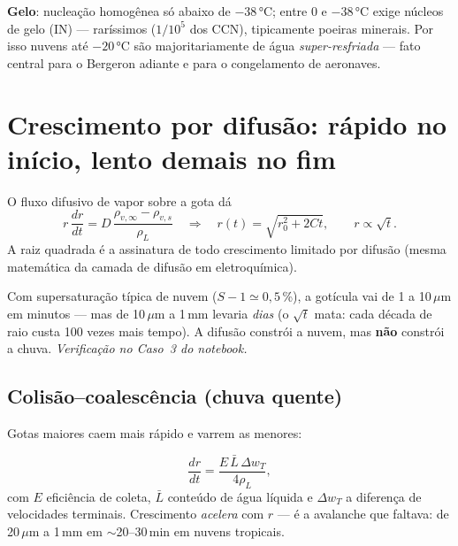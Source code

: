 \documentclass[11pt]{article}
\begin{document}
\textbf{Gelo}: nucleação homogênea só abaixo de $-38\,°$C; entre 0 e
$-38\,°$C exige núcleos de gelo (IN) — raríssimos ($1/10^5$ dos CCN),
tipicamente poeiras minerais. Por isso nuvens até $-20\,°$C são
majoritariamente de água \emph{super-resfriada}
 — fato central para o Bergeron adiante e
para o congelamento de aeronaves.

\section{Crescimento por difusão: rápido no início, lento demais no fim}
\label{sec:crescimento}

\begin{formadif}
O fluxo difusivo de vapor sobre a gota dá
\[ r\,\frac{dr}{dt} = D\,\frac{\rho_{v,\infty} - \rho_{v,s}}{\rho_L}
\quad\Longrightarrow\quad r(t) = \sqrt{r_0^2 + 2Ct},\qquad
r \propto \sqrt{t}. \]
A raiz quadrada é a assinatura de todo crescimento limitado por difusão
(mesma matemática da camada de difusão em eletroquímica).
\end{formadif}

\begin{exemplo}
Com supersaturação típica de nuvem ($S - 1 \simeq 0{,}5$\,\%), a
gotícula vai de 1 a 10\,$\mu$m em minutos — mas de 10\,$\mu$m a 1\,mm
levaria \emph{dias} (o $\sqrt{t}$ mata: cada década de raio custa 100
vezes mais tempo). A difusão constrói a nuvem, mas \textbf{não} constrói
a chuva. \emph{Verificação no Caso~3 do notebook.}
\end{exemplo}

\subsection{Colisão--coalescência (chuva quente)}


Gotas maiores caem mais rápido e varrem as menores:

\begin{formalivro}
\[ \frac{dr}{dt} = \frac{E\,\bar{L}\,\Delta w_T}{4\rho_L}, \]
com $E$ eficiência de coleta, $\bar L$ conteúdo de água líquida e
$\Delta w_T$ a diferença de velocidades terminais. Crescimento
\emph{acelera} com $r$ — é a avalanche que faltava: de 20\,$\mu$m a
1\,mm em $\sim$20--30\,min em nuvens tropicais.
\end{formalivro}
\end{document}
